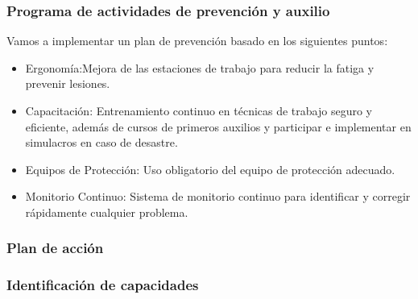     \subsubsection{Programa de actividades de prevención y auxilio}
    
    Vamos a implementar un plan de prevención basado en los siguientes puntos:
    
    \begin{itemize}
        \item Ergonomía:Mejora de las estaciones de trabajo para reducir la fatiga y prevenir lesiones.
    \end{itemize}
    
    \begin{itemize}
        \item Capacitación: Entrenamiento continuo en técnicas de trabajo seguro y eficiente, además de cursos de primeros auxilios y participar e implementar en simulacros en caso de desastre.
    \end{itemize}
    \begin{itemize}
        \item Equipos de Protección: Uso obligatorio del equipo de protección adecuado.
    \end{itemize}
    \begin{itemize}
        \item Monitorio Continuo: Sistema de monitorio continuo para identificar y corregir rápidamente cualquier problema.
    \end{itemize}
    
    \subsubsection{Plan de acción}
    
    \subsubsection{Identificación de capacidades}
    
